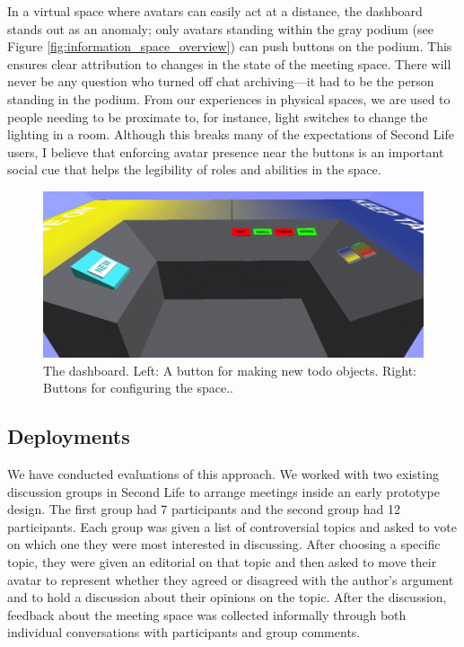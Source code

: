 In a virtual space where avatars can easily act at a distance, the dashboard stands out as an anomaly; only avatars standing within the gray podium (see Figure \ref{fig:information_space_overview}) can push buttons on the podium. This ensures clear attribution to changes in the state of the meeting space. There will never be any question who turned off chat archiving---it had to be the person standing in the podium. From our experiences in physical spaces, we are used to people needing to be proximate to, for instance, light switches to change the lighting in a room. Although this breaks many of the expectations of Second Life users, I believe that enforcing avatar presence near the buttons is an important social cue that helps the legibility of roles and abilities in the space. 

\begin{figure}[tp]
	\includegraphics{figures/dashboard.png}
	\caption{The dashboard. Left: A button for making new todo objects. Right: Buttons for configuring the space..}
	\label{fig:information_space_dashboard}
\end{figure}


\subsection{Deployments}
We have conducted evaluations of this approach. We worked with two existing discussion groups in Second Life to arrange meetings inside an early prototype design. The first group had 7 participants and the second group had 12 participants. Each group was given a list of controversial topics and asked to vote on which one they were most interested in discussing. After choosing a specific topic, they were given an editorial on that topic and then asked to move their avatar to represent whether they agreed or disagreed with the author's argument and to hold a discussion about their opinions on the topic. After the discussion, feedback about the meeting space was collected informally through both individual conversations with participants and group comments.


